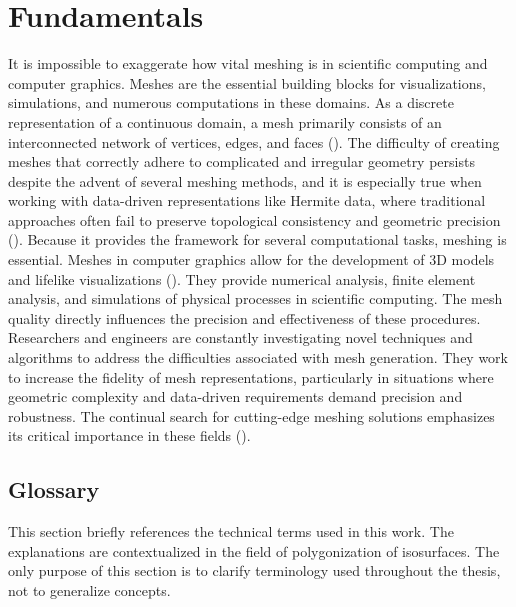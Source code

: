 
\chapter{Fundamentals}\label{Chapter2} %

It is impossible to exaggerate how vital meshing is in scientific computing and computer graphics. Meshes are the essential building blocks for visualizations, simulations, and numerous computations in these domains. As a discrete representation of a continuous domain, a mesh primarily consists of an interconnected network of vertices, edges, and faces (\cite{Zhang_2012}). The difficulty of creating meshes that correctly adhere to complicated and irregular geometry persists despite the advent of several meshing methods, and it is especially true when working with data-driven representations like Hermite data, where traditional approaches often fail to preserve topological consistency and geometric precision (\cite{Schaefer_2007}).
Because it provides the framework for several computational tasks, meshing is essential. Meshes in computer graphics allow for the development of 3D models and lifelike visualizations (\cite{Hristov_2022}). They provide numerical analysis, finite element analysis, and simulations of physical processes in scientific computing. The mesh quality directly influences the precision and effectiveness of these procedures. Researchers and engineers are constantly investigating novel techniques and algorithms to address the difficulties associated with mesh generation. They work to increase the fidelity of mesh representations, particularly in situations where geometric complexity and data-driven requirements demand precision and robustness. The continual search for cutting-edge meshing solutions emphasizes its critical importance in these fields (\cite{Hristov_2022}).

\section{Glossary} \label{Section 2.1}
This section briefly references the technical terms used in this work. The explanations are contextualized in the field of polygonization of isosurfaces. The only purpose of this section is to clarify terminology used throughout the thesis, not to generalize concepts.

